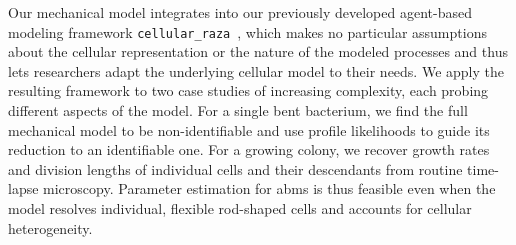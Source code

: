 Our mechanical model integrates into our previously developed agent-based modeling framework
\texttt{cellular\_raza}~\cite{Pleyer2025}, which makes no particular assumptions about the cellular
representation or the nature of the modeled processes and thus lets researchers adapt the underlying
cellular model to their needs.
We apply the resulting framework to two case studies of increasing complexity, each probing
different aspects of the model.
For a single bent bacterium, we find the full mechanical model to be non-identifiable and use
profile likelihoods to guide its reduction to an identifiable one.
For a growing colony, we recover growth rates and division lengths of individual cells and their
descendants from routine time-lapse microscopy.
Parameter estimation for \acp{abm} is thus feasible even when the model resolves individual,
flexible rod-shaped cells and accounts for cellular heterogeneity.
%
